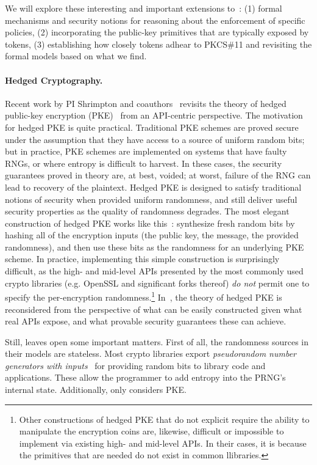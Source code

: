 \begin{task}
  We will explore these interesting and important extensions
  to~\cite{SSW}: (1) formal mechanisms and
security notions for reasoning about the enforcement of specific
policies, (2) incorporating the public-key primitives that are
typically exposed by tokens, (3) establishing how closely tokens
adhear to PKCS\#11 and revisiting the formal models based on what we find.
\end{task}
%

\paragraph{Hedged Cryptography. }
Recent work by PI Shrimpton and coauthors~\cite{BPS} revisits the theory of
hedged public-key encryption (PKE)~\cite{BBN+} from an API-centric perspective.
%
The motivation for hedged PKE is quite practical. Traditional PKE schemes are
proved secure under the assumption that they have access to a source of uniform
random bits; but in practice, PKE schemes are implemented on systems that have
faulty RNGs, or where entropy is difficult to harvest.  In these cases, the
security guarantees proved in theory are, at best, voided; at worst, failure of
the RNG can lead to recovery of the plaintext.
%
Hedged PKE is designed to satisfy traditional notions of security when provided
uniform randomness, and still deliver useful security properties as the quality
of randomness degrades.  The most elegant construction of hedged PKE works like
this~\cite{BBN+,BH15}: synthesize fresh random bits by hashing all of the
encryption inputs (the public key, the message, the provided randomness), and
then use these bits as the randomness for an underlying PKE scheme.  In
practice, implementing this simple construction is surprisingly difficult, as
the high- and mid-level APIs presented by the most commonly used crypto
libraries (e.g. OpenSSL and significant forks thereof) \emph{do not} permit one
to specify the per-encryption randomness.\footnote{Other constructions of hedged
PKE that do not explicit require the ability to manipulate the encryption coins
are, likewise, difficult or impossible to implement via existing high- and
mid-level APIs.  In their cases, it is because the primitives that are needed do
not exist in common llibraries.}
In~\cite{BPS}, the theory of hedged
PKE is reconsidered from the perspective of what can be easily constructed given
what real APIs expose, and what provable security guarantees these can achieve.

Still, \cite{BPS} leaves open some important matters.  First of all, the
randomness sources in their models are stateless.  Most crypto libraries export
\emph{pseudorandom number generators with inputs}~\cite{BH05,DPR+13,ST15} for
providing random bits to library code and applications. These allow the
programmer to add entropy into the PRNG's internal state.  Additionally,
\cite{BPS} only considers PKE.


